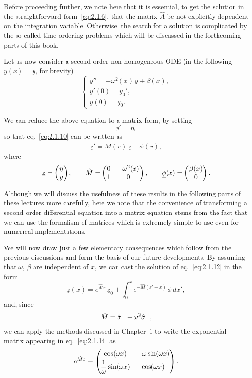 Before proceeding further, we note here that it is essential, to get the solution in the straightforward form~\eqref{eq:2.1.6}, that the matrix $\hat{A}$ be not explicitly dependent on the integration variable. Otherwise, the search for a solution is complicated by the so called time ordering problems which will be discussed in the forthcoming parts of this book.

Let us now consider a second order non-homogeneous ODE (in the following $y(x)=y$, for brevity)
\begin{equation}
\begin{cases}
y''=-\omega^{2}(x)\,y+\beta(x),\\[1mm]
y'(0)=y_{0}',\\
y(0)=y_{0}.
\end{cases}
\label{eq:2.1.10}
\end{equation}

We can reduce the above equation to a matrix form, by setting
\begin{equation}
y'=\eta,
\label{eq:2.1.11}
\end{equation}
so that eq.~\eqref{eq:2.1.10} can be written as
\begin{equation}
\underline{z}'=\hat{M}(x)\,\underline{z}+\underline{\phi}(x),
\label{eq:2.1.12}
\end{equation}
where
\begin{equation}
\underline{z}=\begin{pmatrix}\eta\\y\end{pmatrix},\qquad
\hat{M}=\begin{pmatrix}0&-\omega^{2}(x)\\1&0\end{pmatrix},\qquad
\underline{\phi}(x)=\begin{pmatrix}\beta(x)\\0\end{pmatrix}.
\label{eq:2.1.13}
\end{equation}

Although we will discuss the usefulness of these results in the following parts of these lectures more carefully, here we note that the convenience of transforming a second order differential equation into a matrix equation stems from the fact that we can use the formalism of matrices which is extremely simple to use even for numerical implementations.

We will now draw just a few elementary consequences which follow from the previous discussions and form the basis of our future developments. By assuming that $\omega$, $\beta$ are independent of $x$, we can cast the solution of eq.~\eqref{eq:2.1.12} in the form
\begin{equation}
\underline{z}(x)=e^{\hat{M}x}\,\underline{z}_{0}
+\int_{0}^{x}e^{-\hat{M}(x'-x)}\,\underline{\phi}\,dx',
\label{eq:2.1.14}
\end{equation}
and, since
\begin{equation}
\hat{M}=\hat{\sigma}_{+}-\omega^{2}\hat{\sigma}_{-},
\label{eq:2.1.15}
\end{equation}
we can apply the methods discussed in Chapter~1 to write the exponential matrix appearing in eq.~\eqref{eq:2.1.14} as
\begin{equation}
e^{\hat{M}x}=
\begin{pmatrix}\cos(\omega x)&-\omega\sin(\omega x)\\[1mm]
\dfrac{1}{\omega}\sin(\omega x)&\cos(\omega x)\end{pmatrix}.
\label{eq:2.1.16}
\end{equation}

